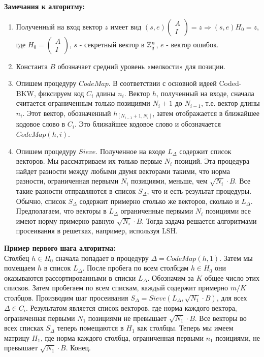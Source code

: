 \documentclass[a4paper,11pt]{article}
\begin{document}
\textbf{Замечания к алгоритму:}\\
\begin{enumerate}
\item Полученный на вход вектор $z$ имеет вид $(s,e)\begin{pmatrix} A\\ I \end{pmatrix} = z \Rightarrow (s,e)H_0 = z$, где $H_0 = \begin{pmatrix} A\\ I \end{pmatrix}$, $s$ - секретный вектор в ${{\mathbb Z}}^{n}_q$, $e$ - вектор ошибок.
\item Константа $B$ обозначает средний уровень «мелкости» для позиции.
\item Опишем процедуру $CodeMap$. В соответствии с основной идеей Coded-BKW, фиксируем код $C_i$ длины $n_i$. Вектор $h$, полученный на входе, сначала считается ограниченным только позициями $N_i+1$ до $N_{i-1}$, т.е. вектор длины $n_i$. Этот вектор, обозначенный $h_{[N_{i-1}+1,N_i]}$, затем отображается в ближайшее кодовое слово в $C_i$. Это ближайшее кодовое слово и обозначается $CodeMap(h,i)$.
\item Опишем процедуру $Sieve$. Полученное на входе $L_{\Delta}$ содержит список векторов. Мы рассматриваем их только первые $N_i$ позиций. Эта процедура найдет разности между любыми двумя векторами такими, что норма разности, ограниченная первыми $N_i$ позициями, меньше, чем $\sqrt{N_i}\cdot B$. Все такие разности отправляются в список $S_{\Delta}$, что и есть результат процедуры. Обычно, список $S_{\Delta}$ содержит примерно столько же векторов, сколько и $L_{\Delta}$. Предполагаем, что векторы в $L_{\Delta}$ ограниченные первыми $N_i$ позициями все имеют норму примерно равную $\sqrt{N_i}\cdot B$. Тогда задача решается алгоритмами просеивания в решетках, например, используя LSH.
\end{enumerate}

\textbf{Пример первого шага алгоритма:}\\
Столбец $h \in H_0$ сначала попадает в процедуру $\Delta=CodeMap(h,1)$. Затем мы помещаем $h$ в список $L_{\Delta}$. После пробега по всем столбцам $h \in H_0$ они оказываются рассортированными в списки $L_{\Delta}$. Обозначим за $K$ общее число этих списков. Затем пробегаем по всем спискам, каждый содержит примерно $m/K$ столбцов. Производим шаг просеивания  $S_{\Delta} = Sieve(L_{\Delta}, \sqrt{N_1}\cdot B)$, для всех $\Delta \in C_i$. Результатом является список векторов, где норма каждого вектора, ограниченная первыми $N_1$ позициями не превышает $\sqrt{N_1}\cdot B$. Все векторы во всех списках $S_{\Delta}$ теперь помещаются в $H_1$ как столбцы. Теперь мы имеем матрицу $H_1$, где норма каждого столбца, ограниченная первыми $n_1$ позициями, не превышает $\sqrt{N_1}\cdot B$. Конец.
\end{document}
